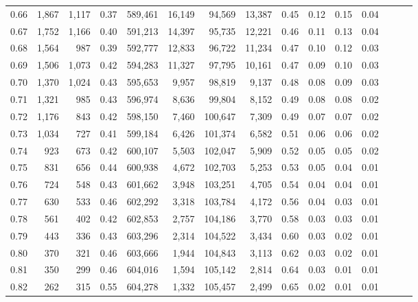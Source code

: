 \begin{tabular}{rrrrrrrrrrrrrrr}
0.66 &   1,867 &  1,117 &  0.37 &  589,461 &   16,149 &   94,569 &   13,387 &  0.45 &  0.12 &  0.15 &      0.04 \\
0.67 &   1,752 &  1,166 &  0.40 &  591,213 &   14,397 &   95,735 &   12,221 &  0.46 &  0.11 &  0.13 &      0.04 \\
0.68 &   1,564 &    987 &  0.39 &  592,777 &   12,833 &   96,722 &   11,234 &  0.47 &  0.10 &  0.12 &      0.03 \\
0.69 &   1,506 &  1,073 &  0.42 &  594,283 &   11,327 &   97,795 &   10,161 &  0.47 &  0.09 &  0.10 &      0.03 \\
0.70 &   1,370 &  1,024 &  0.43 &  595,653 &    9,957 &   98,819 &    9,137 &  0.48 &  0.08 &  0.09 &      0.03 \\
0.71 &   1,321 &    985 &  0.43 &  596,974 &    8,636 &   99,804 &    8,152 &  0.49 &  0.08 &  0.08 &      0.02 \\
0.72 &   1,176 &    843 &  0.42 &  598,150 &    7,460 &  100,647 &    7,309 &  0.49 &  0.07 &  0.07 &      0.02 \\
0.73 &   1,034 &    727 &  0.41 &  599,184 &    6,426 &  101,374 &    6,582 &  0.51 &  0.06 &  0.06 &      0.02 \\
0.74 &     923 &    673 &  0.42 &  600,107 &    5,503 &  102,047 &    5,909 &  0.52 &  0.05 &  0.05 &      0.02 \\
0.75 &     831 &    656 &  0.44 &  600,938 &    4,672 &  102,703 &    5,253 &  0.53 &  0.05 &  0.04 &      0.01 \\
0.76 &     724 &    548 &  0.43 &  601,662 &    3,948 &  103,251 &    4,705 &  0.54 &  0.04 &  0.04 &      0.01 \\
0.77 &     630 &    533 &  0.46 &  602,292 &    3,318 &  103,784 &    4,172 &  0.56 &  0.04 &  0.03 &      0.01 \\
0.78 &     561 &    402 &  0.42 &  602,853 &    2,757 &  104,186 &    3,770 &  0.58 &  0.03 &  0.03 &      0.01 \\
0.79 &     443 &    336 &  0.43 &  603,296 &    2,314 &  104,522 &    3,434 &  0.60 &  0.03 &  0.02 &      0.01 \\
0.80 &     370 &    321 &  0.46 &  603,666 &    1,944 &  104,843 &    3,113 &  0.62 &  0.03 &  0.02 &      0.01 \\
0.81 &     350 &    299 &  0.46 &  604,016 &    1,594 &  105,142 &    2,814 &  0.64 &  0.03 &  0.01 &      0.01 \\
0.82 &     262 &    315 &  0.55 &  604,278 &    1,332 &  105,457 &    2,499 &  0.65 &  0.02 &  0.01 &      0.01 \\

\end{tabular}
